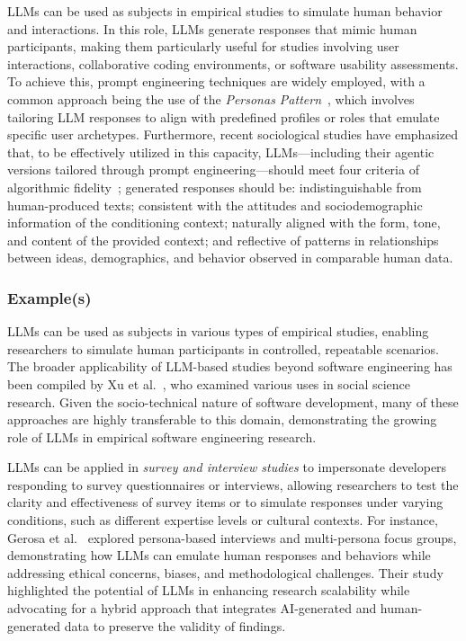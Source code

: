 \documentclass[11pt]{article}
\begin{document}
LLMs can be used as subjects in empirical studies to simulate human behavior and interactions. In this role, LLMs generate responses that mimic human participants, making them particularly useful for studies involving user interactions, collaborative coding environments, or software usability assessments. 
To achieve this, prompt engineering techniques are widely employed, with a common approach being the use of the \textit{Personas Pattern}~\cite{DBLP:journals/corr/abs-2308-07702}, which involves tailoring LLM responses to align with predefined profiles or roles that emulate specific user archetypes. 
Furthermore, recent sociological studies have emphasized that, to be effectively utilized in this capacity, LLMs—including their agentic versions tailored through prompt engineering—should meet four criteria of algorithmic fidelity~\cite{DBLP:journals/corr/abs-2209-06899}; generated responses should be: indistinguishable from human-produced texts; consistent with the attitudes and sociodemographic information of the conditioning context; naturally aligned with the form, tone, and content of the provided context; and reflective of patterns in relationships between ideas, demographics, and behavior observed in comparable human data.

\subsubsection{Example(s)}

LLMs can be used as subjects in various types of empirical studies, enabling researchers to simulate human participants in controlled, repeatable scenarios. The broader applicability of LLM-based studies beyond software engineering has been compiled by Xu et al.~\cite{DBLP:journals/ipm/XuSRGPLSH24}, who examined various uses in social science research. Given the socio-technical nature of software development, many of these approaches are highly transferable to this domain, demonstrating the growing role of LLMs in empirical software engineering research.

LLMs can be applied in \textit{survey and interview studies} to impersonate developers responding to survey questionnaires or interviews, allowing researchers to test the clarity and effectiveness of survey items or to simulate responses under varying conditions, such as different expertise levels or cultural contexts. For instance, Gerosa et al.~\cite{DBLP:journals/ase/GerosaTSS24} explored persona-based interviews and multi-persona focus groups, demonstrating how LLMs can emulate human responses and behaviors while addressing ethical concerns, biases, and methodological challenges. Their study highlighted the potential of LLMs in enhancing research scalability while advocating for a hybrid approach that integrates AI-generated and human-generated data to preserve the validity of findings.
\end{document}
